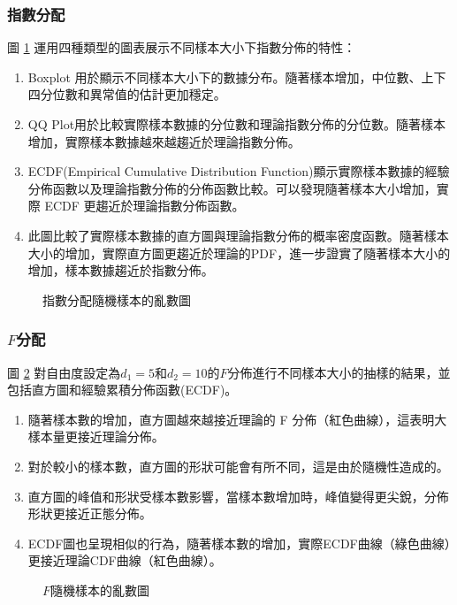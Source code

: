 \subsubsection{指數分配}
圖 \ref{fig:rnb_exponential_distribution} 運用四種類型的圖表展示不同樣本大小下指數分佈的特性：
\begin{enumerate}
\item Boxplot 用於顯示不同樣本大小下的數據分布。隨著樣本增加，中位數、上下四分位數和異常值的估計更加穩定。
\item QQ Plot用於比較實際樣本數據的分位數和理論指數分佈的分位數。隨著樣本增加，實際樣本數據越來越趨近於理論指數分佈。
\item ECDF(Empirical Cumulative Distribution Function)顯示實際樣本數據的經驗分佈函數以及理論指數分佈的分佈函數比較。可以發現隨著樣本大小增加，實際 ECDF 更趨近於理論指數分佈函數。
\item 此圖比較了實際樣本數據的直方圖與理論指數分佈的概率密度函數。隨著樣本大小的增加，實際直方圖更趨近於理論的PDF，進一步證實了隨著樣本大小的增加，樣本數據趨近於指數分佈。
\end{enumerate}
\begin{figure}[H]
    \caption{指數分配隨機樣本的亂數圖}
    \label{fig:rnb_exponential_distribution}
\end{figure}

\subsubsection{$F$分配}
圖 \ref{fig:F-distribution_sample} 對自由度設定為$d_1=5$和$d_2=10$的$F$分佈進行不同樣本大小的抽樣的結果，並包括直方圖和經驗累積分佈函數(ECDF)。
\begin{enumerate}
\item 隨著樣本數的增加，直方圖越來越接近理論的 F 分佈（紅色曲線），這表明大樣本量更接近理論分佈。
\item 對於較小的樣本數，直方圖的形狀可能會有所不同，這是由於隨機性造成的。
\item 直方圖的峰值和形狀受樣本數影響，當樣本數增加時，峰值變得更尖銳，分佈形狀更接近正態分佈。
\item ECDF圖也呈現相似的行為，隨著樣本數的增加，實際ECDF曲線（綠色曲線）更接近理論CDF曲線（紅色曲線）。
\end{enumerate}

\begin{figure}[h]
    \caption{$F$隨機樣本的亂數圖}
    \label{fig:F-distribution_sample}
\end{figure}
